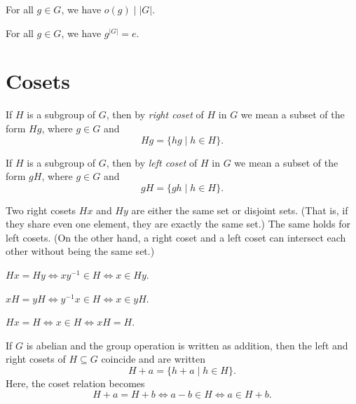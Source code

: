 \begin{corollary}
	For all $g \in G$, we have $o(g) \mid |G|$.
\end{corollary}

\begin{corollary}
	For all $g \in G$, we have $g^{|G|} = e$.
\end{corollary}

\section*{Cosets}

\begin{definition}
	If $H$ is a subgroup of $G$, then by \emph{right coset} of $H$ in $G$ we
	mean a subset of the form $Hg$, where $g \in G$ and
	\[
		Hg = \{hg \mid h \in H\}.
	\]
\end{definition}

\begin{definition}
	If $H$ is a subgroup of $G$, then by \emph{left coset} of $H$ in $G$ we
	mean a subset of the form $gH$, where $g \in G$ and
	\[
		gH = \{gh \mid h \in H\}.
	\]
\end{definition}

\begin{theorem}
	Two right cosets $Hx$ and $Hy$ are either the same set or disjoint sets.
	(That is, if they share even one element, they are exactly the same set.) The
	same holds for left cosets. (On the other hand, a right coset and a left
	coset can intersect each other without being the same set.)
\end{theorem}

\begin{corollary}
	$Hx = Hy \Longleftrightarrow xy^{-1} \in H \Longleftrightarrow x \in Hy$.
\end{corollary}

\begin{corollary}
	$xH = yH \Longleftrightarrow y^{-1}x \in H \Longleftrightarrow x \in yH$.
\end{corollary}

\begin{corollary}
	$Hx = H \Longleftrightarrow x \in H \Longleftrightarrow xH = H$.
\end{corollary}

\begin{notation}
	If $G$ is abelian and the group operation is written as addition, then the
	left and right cosets of $H \subseteq G$ coincide and are written
	\[
		H + a = \{h + a \mid h \in H\}.
	\]
	Here, the coset relation becomes
	\[
		H + a = H + b \Longleftrightarrow a - b \in H \Longleftrightarrow a \in H +
		b.
	\]
\end{notation}

